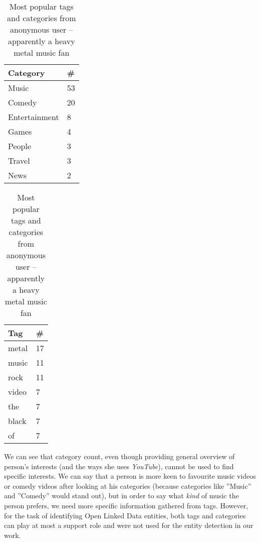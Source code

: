 \begin{table}[ht]
\begin{minipage}[b]{0.5\linewidth}\centering

\begin{tabular}{| l | l |}
Category & \# \\ \hline
Music & 53 \\
Comedy & 20 \\
Entertainment & 8 \\
Games & 4 \\
People & 3 \\
Travel & 3 \\
News & 2 \\
\end{tabular}

\end{minipage}
\hspace{0.5cm}
\begin{minipage}[b]{0.5\linewidth}
\centering

\begin{tabular}{| l | l |}
Tag & \# \\ \hline
metal & 17 \\
music & 11 \\
rock & 11 \\
video & 7 \\
the & 7 \\
black & 7 \\
of & 7 \\
\end{tabular}

\end{minipage}

\caption{Most popular tags and categories from anonymous user -- apparently a
heavy metal music fan}
\end{table}

We can see that category count, even though providing general overview of
person's interests (and the ways she uses \textit{YouTube}), cannot be used to find
specific interests. We can say that a person is more keen to
favourite music videos or comedy videos after looking at his categories
(because categories like ''Music'' and ''Comedy'' would stand out), but in
order to say what \textit{kind} of music the person prefers, we need more specific
information gathered from \eg tags. However, for the task of identifying Open Linked
Data entities, both tags and categories can play at most a support role and were
not used for the entity detection in our work.

